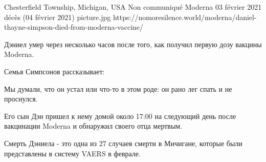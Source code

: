           {Chesterfield Township, Michigan, USA}
          {Non communiqué}
          {Moderna}
          {03 février 2021}
          {décès (04 février 2021)}
          {picture.jpg}
          {https://nomoresilence.world/moderna/daniel-thayne-simpson-died-from-moderna-vaccine/}
          {

Дэниел умер через несколько часов после того, как получил первую дозу вакцины Moderna.

Семья Симпсонов рассказывает:

Мы думали, что он устал или что-то в этом роде: он рано лег спать и не проснулся.

Его сын Дэн пришел к нему домой около 17:00 на следующий день после вакцинации Moderna и обнаружил своего отца мертвым.

Смерть Дэниела - это одна из 27 случаев смерти в Мичигане, которые были представлены в систему VAERS в феврале.

}
